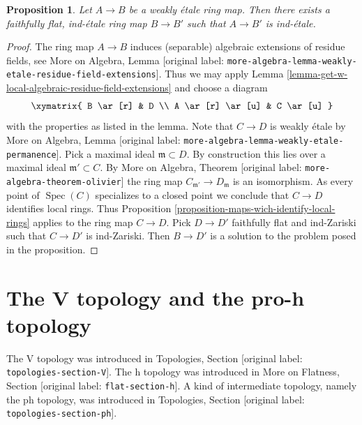 \documentclass[10pt,a4paper]{article}
\theoremstyle{plain}
\newtheorem{proposition}[subsection]{Proposition}
\theoremstyle{definition}
\theoremstyle{remark}
\numberwithin{equation}{subsection}
\def\Spec{\mathop{\mathrm{Spec}}}
\begin{document}
\begin{proposition}
\label{proposition-weakly-etale}
Let $A \to B$ be a weakly \'etale ring map.
Then there exists a faithfully flat, ind-\'etale ring map
$B \to B'$ such that $A \to B'$ is ind-\'etale.
\end{proposition}

\begin{proof}
The ring map $A \to B$ induces (separable) algebraic extensions of
residue fields, see More on Algebra, Lemma
\textnormal{[original label: \nolinkurl{more-algebra-lemma-weakly-etale-residue-field-extensions}]}.
Thus we may apply
Lemma \ref{lemma-get-w-local-algebraic-residue-field-extensions}
and choose a diagram
$$
\xymatrix{
B \ar[r] & D \\
A \ar[r] \ar[u] & C \ar[u]
}
$$
with the properties as listed in the lemma. Note that $C \to D$
is weakly \'etale by
More on Algebra, Lemma \textnormal{[original label: \nolinkurl{more-algebra-lemma-weakly-etale-permanence}]}.
Pick a maximal ideal $\mathfrak m \subset D$. By construction
this lies over a maximal ideal $\mathfrak m' \subset C$.
By More on Algebra, Theorem \textnormal{[original label: \nolinkurl{more-algebra-theorem-olivier}]}
the ring map $C_{\mathfrak m'} \to D_\mathfrak m$ is an isomorphism.
As every point of $\Spec(C)$ specializes to a closed point we conclude that
$C \to D$ identifies local rings.
Thus Proposition \ref{proposition-maps-wich-identify-local-rings}
applies to the ring map $C \to D$. Pick $D \to D'$ faithfully flat
and ind-Zariski such that $C \to D'$ is ind-Zariski. Then
$B \to D'$ is a solution to the problem posed in the proposition.
\end{proof}





\section{The V topology and the pro-h topology}
\label{section-V-versus-pro-h}

\noindent
The V topology was introduced in
Topologies, Section \textnormal{[original label: \nolinkurl{topologies-section-V}]}.
The h topology was introduced in
More on Flatness, Section \textnormal{[original label: \nolinkurl{flat-section-h}]}.
A kind of intermediate topology, namely the ph topology,
was introduced in Topologies, Section \textnormal{[original label: \nolinkurl{topologies-section-ph}]}.
\end{document}
